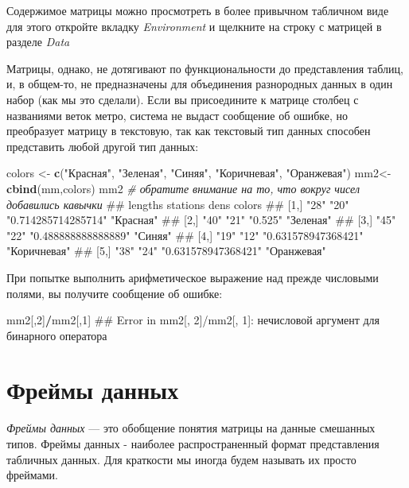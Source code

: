 \documentclass[]{book}
\newenvironment{Shaded}{\begin{snugshade}}{\end{snugshade}}
\newcommand{\KeywordTok}[1]{\textcolor[rgb]{0.13,0.29,0.53}{\textbf{#1}}}
\newcommand{\DecValTok}[1]{\textcolor[rgb]{0.00,0.00,0.81}{#1}}
\newcommand{\StringTok}[1]{\textcolor[rgb]{0.31,0.60,0.02}{#1}}
\newcommand{\CommentTok}[1]{\textcolor[rgb]{0.56,0.35,0.01}{\textit{#1}}}
\newcommand{\OperatorTok}[1]{\textcolor[rgb]{0.81,0.36,0.00}{\textbf{#1}}}
\newcommand{\NormalTok}[1]{#1}
\begin{document}
Содержимое матрицы можно просмотреть в более привычном табличном виде
для этого откройте вкладку \emph{Environment} и щелкните на строку с
матрицей в разделе \emph{Data}

Матрицы, однако, не дотягивают по функциональности до представления
таблиц, и, в общем-то, не предназначены для объединения разнородных
данных в один набор (как мы это сделали). Если вы присоедините к матрице
столбец с названиями веток метро, система не выдаст сообщение об ошибке,
но преобразует матрицу в текстовую, так как текстовый тип данных
способен представить любой другой тип данных:

\begin{Shaded}
\begin{Highlighting}[]
\NormalTok{colors <-}\StringTok{ }\KeywordTok{c}\NormalTok{(}\StringTok{"Красная"}\NormalTok{, }\StringTok{"Зеленая"}\NormalTok{, }\StringTok{"Синяя"}\NormalTok{, }\StringTok{"Коричневая"}\NormalTok{, }\StringTok{"Оранжевая"}\NormalTok{)}
\NormalTok{mm2<-}\KeywordTok{cbind}\NormalTok{(mm,colors)}
\NormalTok{mm2  }\CommentTok{# обратите внимание на то, что вокруг чисел добавились кавычки}
\NormalTok{##      lengths stations dens                colors      }
\NormalTok{## [1,] "28"    "20"     "0.714285714285714" "Красная"   }
\NormalTok{## [2,] "40"    "21"     "0.525"             "Зеленая"   }
\NormalTok{## [3,] "45"    "22"     "0.488888888888889" "Синяя"     }
\NormalTok{## [4,] "19"    "12"     "0.631578947368421" "Коричневая"}
\NormalTok{## [5,] "38"    "24"     "0.631578947368421" "Оранжевая"}
\end{Highlighting}
\end{Shaded}

При попытке выполнить арифметическое выражение над прежде числовыми
полями, вы получите сообщение об ошибке:

\begin{Shaded}
\begin{Highlighting}[]
\NormalTok{mm2[,}\DecValTok{2}\NormalTok{]}\OperatorTok{/}\NormalTok{mm2[,}\DecValTok{1}\NormalTok{]}
\NormalTok{## Error in mm2[, 2]/mm2[, 1]: нечисловой аргумент для бинарного оператора}
\end{Highlighting}
\end{Shaded}

\section{Фреймы данных}\label{-}

\emph{Фреймы данных} --- это обобщение понятия матрицы на данные
смешанных типов. Фреймы данных - наиболее распространенный формат
представления табличных данных. Для краткости мы иногда будем называть
их просто фреймами.
\end{document}
